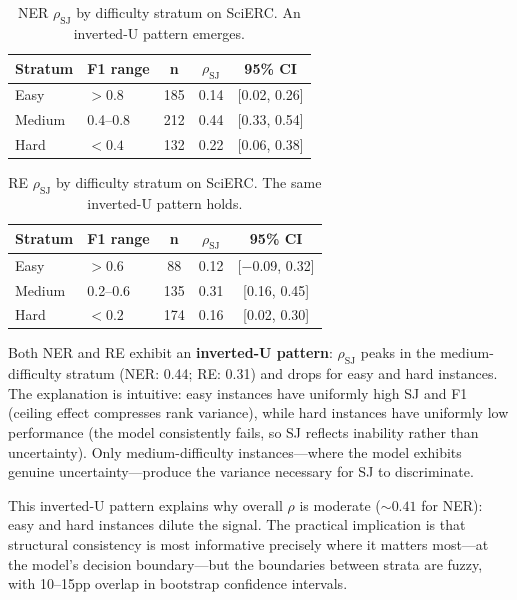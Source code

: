 \documentclass[11pt]{article}
\begin{document}
\begin{table}[t]
\centering
\caption{NER $\rho_{\text{SJ}}$ by difficulty stratum on SciERC. An inverted-U pattern emerges.}
\label{tab:strata_ner}
\begin{tabular}{llccc}
\toprule
\textbf{Stratum} & \textbf{F1 range} & \textbf{n} & \textbf{$\rho_{\text{SJ}}$} & \textbf{95\% CI} \\
\midrule
Easy   & $>0.8$   & 185 & 0.14 & [0.02, 0.26] \\
Medium & 0.4--0.8 & 212 & 0.44 & [0.33, 0.54] \\
Hard   & $<0.4$   & 132 & 0.22 & [0.06, 0.38] \\
\bottomrule
\end{tabular}
\end{table}

\begin{table}[t]
\centering
\caption{RE $\rho_{\text{SJ}}$ by difficulty stratum on SciERC. The same inverted-U pattern holds.}
\label{tab:strata_re}
\begin{tabular}{llccc}
\toprule
\textbf{Stratum} & \textbf{F1 range} & \textbf{n} & \textbf{$\rho_{\text{SJ}}$} & \textbf{95\% CI} \\
\midrule
Easy   & $>0.6$   &  88 & 0.12 & [$-$0.09, 0.32] \\
Medium & 0.2--0.6 & 135 & 0.31 & [0.16, 0.45] \\
Hard   & $<0.2$   & 174 & 0.16 & [0.02, 0.30] \\
\bottomrule
\end{tabular}
\end{table}

Both NER and RE exhibit an \textbf{inverted-U pattern}: $\rho_{\text{SJ}}$ peaks in the medium-difficulty stratum (NER: 0.44; RE: 0.31) and drops for easy and hard instances.
The explanation is intuitive: easy instances have uniformly high SJ and F1 (ceiling effect compresses rank variance), while hard instances have uniformly low performance (the model consistently fails, so SJ reflects inability rather than uncertainty).
Only medium-difficulty instances---where the model exhibits genuine uncertainty---produce the variance necessary for SJ to discriminate.

This inverted-U pattern explains why overall $\rho$ is moderate (${\sim}0.41$ for NER): easy and hard instances dilute the signal.
The practical implication is that structural consistency is most informative precisely where it matters most---at the model's decision boundary---but the boundaries between strata are fuzzy, with 10--15pp overlap in bootstrap confidence intervals.
\end{document}
